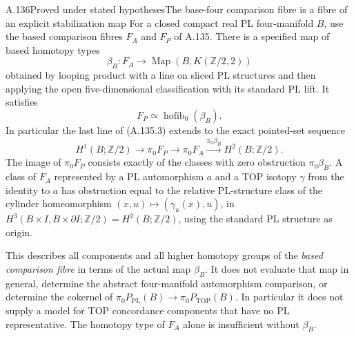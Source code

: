 \begin{saresult}{A.136}{Proved under stated hypotheses}{The base-four comparison fibre is a fibre of an explicit stabilization map}
For a closed compact real PL four-manifold $B$, use the based comparison
fibres $F_A$ and $F_P$ of A.135. There is a specified map of based
homotopy types
\[
 \beta_B:F_A\longrightarrow\operatorname{Map}(B,K(\mathbb Z/2,2))
                                                        \tag{A.136.1}
\]
obtained by looping product with a line on sliced PL structures and
then applying the open five-dimensional classification with its
standard PL lift. It satisfies
\[
 F_P\simeq\operatorname{hofib}_0(\beta_B).                \tag{A.136.2}
\]
In particular the last line of (A.135.3) extends to the exact
pointed-set sequence
\[
 H^1(B;\mathbb Z/2)\longrightarrow\pi_0F_P
 \longrightarrow\pi_0F_A
 \xrightarrow{\pi_0\beta_B}H^2(B;\mathbb Z/2).           \tag{A.136.3}
\]
The image of $\pi_0F_P$ consists exactly of the classes with zero
obstruction $\pi_0\beta_B$.
A class of $F_A$ represented by a PL automorphism $a$ and a TOP isotopy
$\gamma$ from the identity to $a$ has obstruction equal to the relative
PL-structure class of the cylinder homeomorphism
$(x,u)\mapsto(\gamma_u(x),u)$, in
$H^3(B\times I,B\times\partial I;\mathbb Z/2)
=H^2(B;\mathbb Z/2)$, using the standard PL structure as origin.

This describes all components and all higher homotopy groups of the
\emph{based comparison fibre} in terms of the actual map $\beta_B$.
It does not evaluate that map in general, determine the abstract
four-manifold automorphism comparison, or determine the cokernel of
$\pi_0P_{\mathrm{PL}}(B)\to\pi_0P_{\mathrm{TOP}}(B)$.
In particular it does not supply a model for TOP concordance components
that have no PL representative. The homotopy type of $F_A$ alone is
insufficient without $\beta_B$.
\end{saresult}
